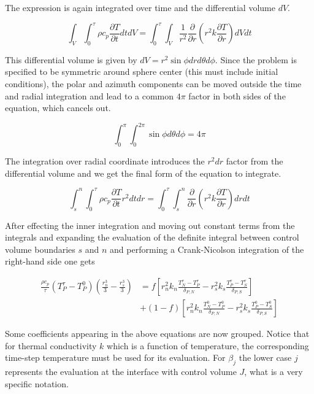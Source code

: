 \documentclass[oneside]{textbook}
\begin{document}
The expression is again integrated over time and the differential volume $dV$.

\begin{equation}
\int_{V}\int_{0}^{\tau}
\rho{}c_{p}\frac{\partial{}T}{\partial{}t}dtdV=
\int_{0}^{\tau}\int_{V}
\frac{1}{r^2}\frac{\partial}{\partial{}r}
\left(r^2k\frac{\partial{}T}{\partial{}r}\right)dVdt
\end{equation}

This differential volume is given by $dV=r^2\sin\phi{}dr{}d\theta{}d\phi$. Since the problem is specified to be symmetric around sphere center (this must include initial conditions), the polar and azimuth components can be moved outside the time and radial integration and lead to a common $4\pi$ factor in both sides of the equation, which cancels out.

\begin{equation}
\int_{0}^{\pi}\int_{0}^{2\pi}\sin\phi{}d\theta{}d\phi=4\pi
\end{equation}

The integration over radial coordinate introduces the $r^2dr$ factor from the differential volume and we get the final form of the equation to integrate.

\begin{equation}
\int_{s}^{n}\int_{0}^{\tau}
\rho{}c_{p}\frac{\partial{}T}{\partial{}t}r^2dtdr=
\int_{0}^{\tau}\int_{s}^{n}
\frac{\partial}{\partial{}r}
\left(r^2k\frac{\partial{}T}{\partial{}r}\right)drdt
\end{equation}

After effecting the inner integration and moving out constant terms from the integrals and expanding the evaluation of the definite integral between control volume boundaries $s$ and $n$ and performing a Crank-Nicolson integration of the right-hand side one gets

\begin{equation}
\begin{aligned}
	\frac{\rho{}c_{p}}{\tau}
	\left(T_P^{\tau}-T_P^{0}\right)
	\left(\frac{r_n^3}{3}-\frac{r_s^3}{3}\right)
	&=f\left[
	r_n^2k_n\frac{T_N^{\tau}-T_P^{\tau}}{\delta_{P,N}}-
	r_s^2k_s\frac{T_P^{\tau}-T_S^{\tau}}{\delta_{P,S}}
	\right]\\[8pt]
	&+(1-f)\left[
	r_n^2k_n\frac{T_N^{0}-T_P^{0}}{\delta_{P,N}}-
	r_s^2k_s\frac{T_P^{0}-T_S^{0}}{\delta_{P,S}}
	\right]
\end{aligned}
\end{equation}

Some coefficients appearing in the above equations are now grouped. Notice that for thermal conductivity $k$ which is a function of temperature, the corresponding time-step temperature must be used for its evaluation. For $\beta_{j}$ the lower case $j$ represents the evaluation at the interface with control volume $J$, what is a very specific notation.
\end{document}
